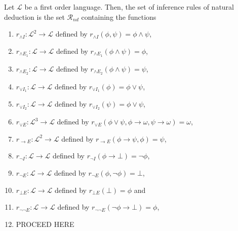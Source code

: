 \begin{definition}\label{def:Rnd}
    Let $\mathcal{L}$ be a first order language. Then, the set of inference rules of natural deduction is the set $\mathcal{R}_{nd}$ containing the functions 
    \begin{enumerate}
        \item $r_{\land I} : \mathcal{L}^2 \to \mathcal{L}$ defined by $r_{\land I}(\phi,\psi) = \phi \land \psi$,
        \item $r_{\land E_1} : \mathcal{L} \to \mathcal{L}$ defined by $r_{\land E_1}(\phi \land \psi) = \phi$,
        \item $r_{\land E_2} : \mathcal{L} \to \mathcal{L}$ defined by $r_{\land E_2}(\phi \land \psi) = \psi$,
        \item $r_{\lor I_1} : \mathcal{L} \to \mathcal{L}$ defined by $r_{\lor I_1}(\phi) = \phi \lor \psi$,
        \item $r_{\lor I_2} : \mathcal{L} \to \mathcal{L}$ defined by $r_{\lor I_2}(\psi) = \phi \lor \psi$,
        \item $r_{\lor E} : \mathcal{L}^3 \to \mathcal{L}$ defined by $r_{\lor E}(\phi \lor \psi, \phi \to \omega, \psi \to \omega)=\omega$,
        \item $r_{\to E} : \mathcal{L}^2 \to \mathcal{L}$ defined by $r_{\to E}(\phi \to \psi, \phi)=\psi$,
        \item $r_{\neg I} : \mathcal{L} \to \mathcal{L}$ defined by $r_{\neg I}(\phi \to \bot) = \neg \phi$,
        \item $r_{\neg E} : \mathcal{L} \to \mathcal{L}$ defined by $r_{\neg E}(\phi, \neg \phi)= \bot$,
        \item $r_{\bot E} : \mathcal{L} \to \mathcal{L}$ defined by $r_{\bot E}(\bot)=\phi$ and
        \item $r_{\neg \neg E} : \mathcal{L} \to \mathcal{L}$ defined by $r_{\neg \neg E}(\neg \phi \to \bot)=\phi$,
        \item PROCEED HERE
    \end{enumerate}
\end{definition}

